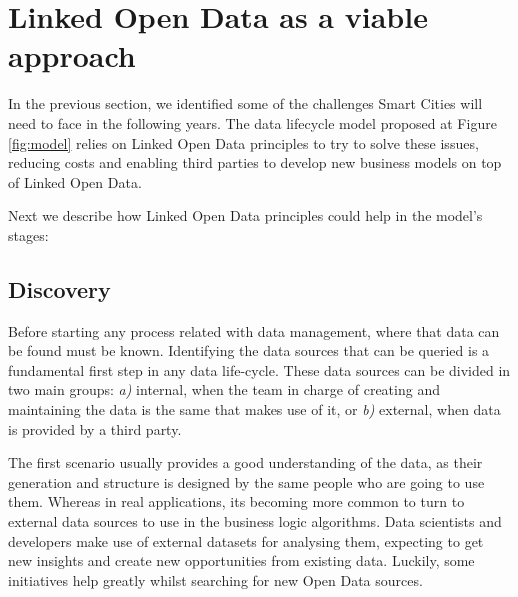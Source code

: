 \section{Linked Open Data as a viable approach}

In the previous section, we identified some of the challenges Smart Cities  will need to face in the following years. The data lifecycle model proposed at Figure \ref{fig:model} relies on Linked Open Data principles to try to solve these issues, reducing costs and enabling third parties to develop new business models on top of Linked Open Data.

Next we describe how Linked Open Data  principles could help in the model's stages:

\subsection{Discovery}\label{subsec:discovery}

Before starting any process related with data management, where that data can be found must be known. Identifying the data sources that can be queried is a fundamental first step in any data life-cycle. These data sources can be divided in two main groups: \textit{a)} internal, when the team in charge of creating and maintaining the data is the same that makes use of it, or \textit{b)} external, when data is provided by a third party.

The first scenario usually provides a good understanding of the data, as their generation and structure is designed by the same people who are going to use them. Whereas in real applications, its becoming more common to turn to external data sources to use in the business logic algorithms. Data scientists and developers make use of external datasets for analysing them, expecting to get new insights and create new opportunities from existing data. Luckily, some initiatives help greatly whilst searching for new Open Data sources.

